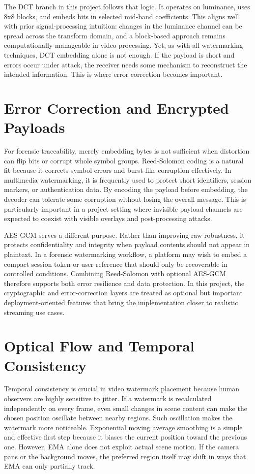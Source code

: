 \documentclass[12pt,oneside]{report}
\begin{document}
The DCT branch in this project follows that logic. It operates on luminance, uses 8x8 blocks, and embeds bits in selected mid-band coefficients. This aligns well with prior signal-processing intuition: changes in the luminance channel can be spread across the transform domain, and a block-based approach remains computationally manageable in video processing. Yet, as with all watermarking techniques, DCT embedding alone is not enough. If the payload is short and errors occur under attack, the receiver needs some mechanism to reconstruct the intended information. This is where error correction becomes important.

\section{Error Correction and Encrypted Payloads}
For forensic traceability, merely embedding bytes is not sufficient when distortion can flip bits or corrupt whole symbol groups. Reed-Solomon coding is a natural fit because it corrects symbol errors and burst-like corruption effectively. In multimedia watermarking, it is frequently used to protect short identifiers, session markers, or authentication data. By encoding the payload before embedding, the decoder can tolerate some corruption without losing the overall message. This is particularly important in a project setting where invisible payload channels are expected to coexist with visible overlays and post-processing attacks.

AES-GCM serves a different purpose. Rather than improving raw robustness, it protects confidentiality and integrity when payload contents should not appear in plaintext. In a forensic watermarking workflow, a platform may wish to embed a compact session token or user reference that should only be recoverable in controlled conditions. Combining Reed-Solomon with optional AES-GCM therefore supports both error resilience and data protection. In this project, the cryptographic and error-correction layers are treated as optional but important deployment-oriented features that bring the implementation closer to realistic streaming use cases.

\section{Optical Flow and Temporal Consistency}
Temporal consistency is crucial in video watermark placement because human observers are highly sensitive to jitter. If a watermark is recalculated independently on every frame, even small changes in scene content can make the chosen position oscillate between nearby regions. Such oscillation makes the watermark more noticeable. Exponential moving average smoothing is a simple and effective first step because it biases the current position toward the previous one. However, EMA alone does not exploit actual scene motion. If the camera pans or the background moves, the preferred region itself may shift in ways that EMA can only partially track.
\end{document}

